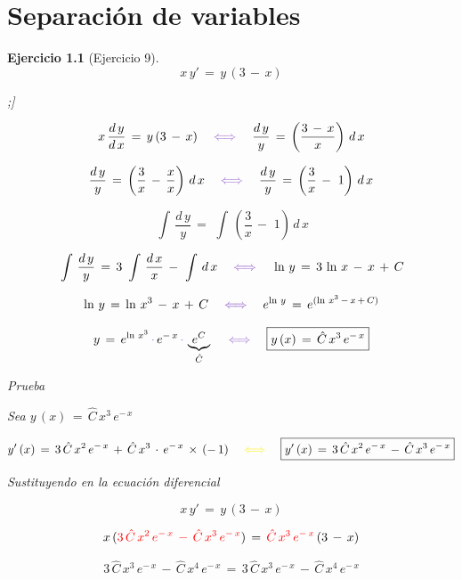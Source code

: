 \documentclass[a4paper,11pt,openany]{book}
\newtheorem{ejer}{Ejercicio}[section]
\newcommand*{\itembolasazules}[1]{%

\footnotesize\protect\tikz[baseline=-3pt]%

\protect\node[scale=.7, circle, shade, ball 

color=green]{\color{white}\Large\bf#1};}
\begin{document}
\chapter{Separación de variables} 

\begin{ejer}[Ejercicio 9] 

  $$x\,y'\,=\,y\,(3\,-\,x)$$ 
  
\begin{enumerate}[label=\itembolasazules{\arabic*}] 

 $$x\,\dfrac{d\,y}{d\,x}\,=\,y\,(3\,-\,x) \quad \textcolor{amethyst}{\iff} \quad \dfrac{d\,y}{y}\,=\,\left(\dfrac{3\,-\,x}{x} \right)\,d\,x$$ 

 $$\dfrac{d\,y}{y}\,=\,\left(\dfrac{3}{x}\,-\,\dfrac{x}{x} \right)\,d\,x \quad \textcolor{amethyst}{\iff} \quad \dfrac{d\,y}{y}\,=\,\left(\dfrac{3}{x}\,-\,\,1 \right)\,d\,x$$ 

 $$\displaystyle\,\int\,\dfrac{d\,y}{y}\,=\,\displaystyle\,\int\,\left(\dfrac{3}{x}\,-\,\,1 \right)\,d\,x$$ 

 $$\displaystyle\,\int\,\dfrac{d\,y}{y}\,=\,3\,\displaystyle\,\int\,\dfrac{d\,x}{x}\,-\,\displaystyle\,\int\,d\,x \quad \textcolor{amethyst}{\iff} \quad \ln\,y\,=\,3\,\ln\,x\,-\,x\,+\,C$$ 

 $$\ln\,y\,=\,\ln\,x^{3}\,-\,x\,+\,C \quad \textcolor{amethyst}{\iff} \quad e^{\ln\,y}\,=\,e^{(\ln\,x^{3}\,-\,x\,+\,C)}$$ 

 $$y\,=\,e^{\ln\,x^{3}}\,\textcolor{amethyst}{\cdot}\,e^{-\,x}\,\textcolor{amethyst}{\cdot}\,\underbrace{e^{C}}_{\hat{C}} \quad \textcolor{amethyst}{\iff} \quad \boxed{y\,(x)\,=\,\hat{C}\,x^{3}\,e^{-\,x}}$$ 

Prueba  

Sea $\boxed{y\,(x)\,=\,\hat{C}\,x^{3}\,e^{-\,x}}$ 

$$y'\,(x)\,=\,3\,\hat{C}\,x^{2}\,e^{-\,x}\,+\,\hat{C}\,x^{3}\,\cdot\,e^{-\,x}\,\times\,(-\,1) \quad \textcolor{yellow}{\iff} \quad \boxed{y'\,(x)\,=\,3\,\hat{C}\,x^{2}\,e^{-\,x}\,-\,\hat{C}\,x^{3}\,e^{-\,x}}$$ 

Sustituyendo en la ecuación diferencial 

$$x\,y'\,=\,y\,(3\,-\,x)$$  

$$x\,(\textcolor{red}{3\,\hat{C}\,x^{2}\,e^{-\,x}\,-\,\hat{C}\,x^{3}\,e^{-\,x}})\,=\,\textcolor{red}{\hat{C}\,x^{3}\,e^{-\,x}}\,(3\,-\,x)$$ 

$$\boxed{3\,\hat{C}\,x^{3}\,e^{-\,x}\,-\,\hat{C}\,x^{4}\,e^{-\,x}\,=\,3\,\hat{C}\,x^{3}\,e^{-\,x}\,-\,\hat{C}\,x^{4}\,e^{-\,x}}$$ 

\end{enumerate} 

\end{ejer} 
\end{document}
